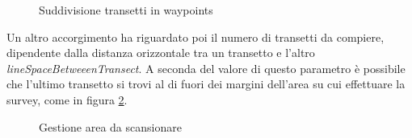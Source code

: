 \documentclass{article}
\begin{document}
                \begin{figure} [ht]
                    \caption{Suddivisione transetti in waypoints}
                    \label{fig:punti}
                \end{figure}

                Un altro accorgimento ha riguardato poi il numero di transetti da compiere,
                dipendente dalla distanza orizzontale tra un transetto e l'altro \emph{lineSpaceBetweeenTransect}.
                A seconda del valore di questo parametro è possibile che 
                l'ultimo transetto si trovi al di fuori dei margini dell'area su cui effettuare la survey, come in figura \ref{fig:trans}.

                \begin{figure} [ht]
                    \caption{Gestione area da scansionare}
                    \label{fig:trans}
                \end{figure}
\end{document}
